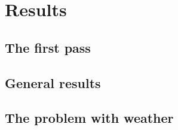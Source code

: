 \documentclass[11pt]{article} %
\begin{document}
\section{Results}
\label{sec:results}

\subsection{The first pass}
\label{sec:firstpass}
% 

\subsection{General results}
\label{sec:gen_results}
% 
% 

\subsection{The problem with weather}
\label{sec:weather_prob}
\end{document}
